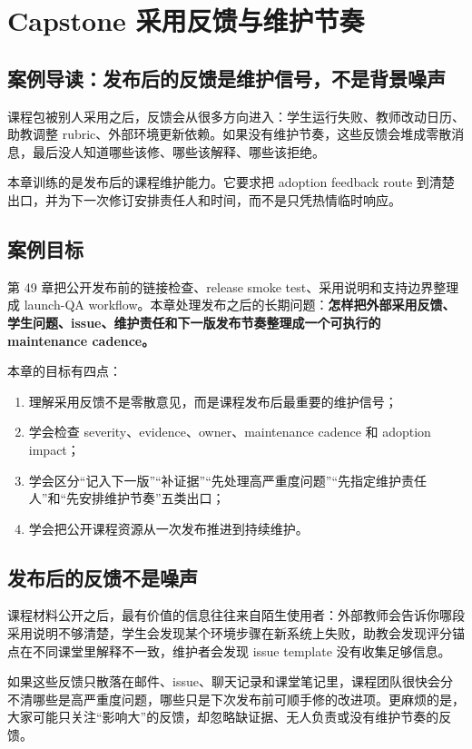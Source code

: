 \chapter{Capstone 采用反馈与维护节奏}

\section{案例导读：发布后的反馈是维护信号，不是背景噪声}

课程包被别人采用之后，反馈会从很多方向进入：学生运行失败、教师改动日历、助教调整 rubric、外部环境更新依赖。如果没有维护节奏，这些反馈会堆成零散消息，最后没人知道哪些该修、哪些该解释、哪些该拒绝。

本章训练的是发布后的课程维护能力。它要求把 adoption feedback route 到清楚出口，并为下一次修订安排责任人和时间，而不是只凭热情临时响应。

\section{案例目标}

第 49 章把公开发布前的链接检查、release smoke test、采用说明和支持边界整理成 launch-QA workflow。本章处理发布之后的长期问题：\textbf{怎样把外部采用反馈、学生问题、issue、维护责任和下一版发布节奏整理成一个可执行的 maintenance cadence。}

本章的目标有四点：

\begin{enumerate}
    \item 理解采用反馈不是零散意见，而是课程发布后最重要的维护信号；
    \item 学会检查 severity、evidence、owner、maintenance cadence 和 adoption impact；
    \item 学会区分“记入下一版”“补证据”“先处理高严重度问题”“先指定维护责任人”和“先安排维护节奏”五类出口；
    \item 学会把公开课程资源从一次发布推进到持续维护。
\end{enumerate}

\section{发布后的反馈不是噪声}

课程材料公开之后，最有价值的信息往往来自陌生使用者：外部教师会告诉你哪段采用说明不够清楚，学生会发现某个环境步骤在新系统上失败，助教会发现评分锚点在不同课堂里解释不一致，维护者会发现 issue template 没有收集足够信息。

如果这些反馈只散落在邮件、issue、聊天记录和课堂笔记里，课程团队很快会分不清哪些是高严重度问题，哪些只是下次发布前可顺手修的改进项。更麻烦的是，大家可能只关注“影响大”的反馈，却忽略缺证据、无人负责或没有维护节奏的反馈。

